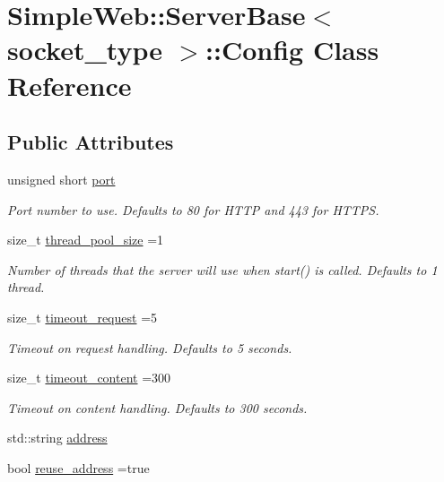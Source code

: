 \hypertarget{a00062}{}\section{Simple\+Web\+:\+:Server\+Base$<$ socket\+\_\+type $>$\+:\+:Config Class Reference}
\label{a00062}
\subsection*{Public Attributes}
\begin{DoxyCompactItemize}
\item 
unsigned short \hyperlink{a00062_aa80030952ff056db08f736d5537bd2c9}{port}\hypertarget{a00062_aa80030952ff056db08f736d5537bd2c9}{}\label{a00062_aa80030952ff056db08f736d5537bd2c9}

\begin{DoxyCompactList}\small\item\em Port number to use. Defaults to 80 for H\+T\+TP and 443 for H\+T\+T\+PS. \end{DoxyCompactList}\item 
size\+\_\+t \hyperlink{a00062_abfbbfc38bfd2887739676424509dbb45}{thread\+\_\+pool\+\_\+size} =1\hypertarget{a00062_abfbbfc38bfd2887739676424509dbb45}{}\label{a00062_abfbbfc38bfd2887739676424509dbb45}

\begin{DoxyCompactList}\small\item\em Number of threads that the server will use when start() is called. Defaults to 1 thread. \end{DoxyCompactList}\item 
size\+\_\+t \hyperlink{a00062_aa27e09c83d7e26dff6e72e8d1084d5a0}{timeout\+\_\+request} =5\hypertarget{a00062_aa27e09c83d7e26dff6e72e8d1084d5a0}{}\label{a00062_aa27e09c83d7e26dff6e72e8d1084d5a0}

\begin{DoxyCompactList}\small\item\em Timeout on request handling. Defaults to 5 seconds. \end{DoxyCompactList}\item 
size\+\_\+t \hyperlink{a00062_ac1f74ff91196c3a72446786b54a77b58}{timeout\+\_\+content} =300\hypertarget{a00062_ac1f74ff91196c3a72446786b54a77b58}{}\label{a00062_ac1f74ff91196c3a72446786b54a77b58}

\begin{DoxyCompactList}\small\item\em Timeout on content handling. Defaults to 300 seconds. \end{DoxyCompactList}\item 
std\+::string \hyperlink{a00062_add7a705aca3533bf0371708b19bb691c}{address}
\item 
bool \hyperlink{a00062_aab9c347da5390b176d37dac2dfbd9fae}{reuse\+\_\+address} =true\hypertarget{a00062_aab9c347da5390b176d37dac2dfbd9fae}{}\label{a00062_aab9c347da5390b176d37dac2dfbd9fae}


\end{DoxyCompactItemize}
